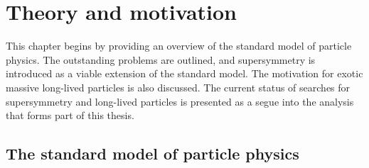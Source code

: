 \chapter{Theory and motivation}
\label{chap:theory}



This chapter begins by providing an overview of the standard model of particle 
physics. The outstanding problems are outlined, and supersymmetry is introduced 
as a viable extension of the standard model. The motivation for exotic massive 
long-lived particles is also discussed. The current status of searches for 
supersymmetry and long-lived particles is presented as a segue into the 
analysis that forms part of this thesis.

\section{The standard model of particle physics}
\label{sec:theory-sm}

